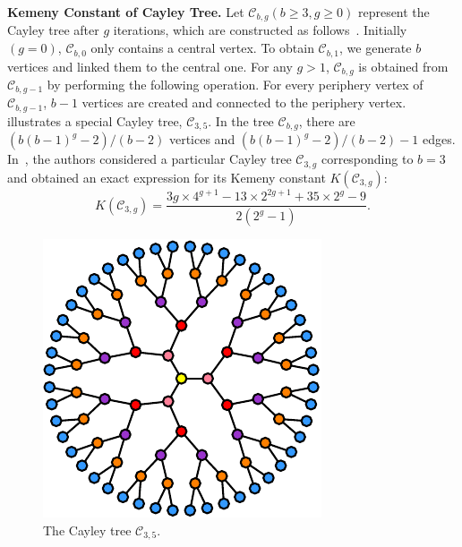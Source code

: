 \documentclass[10pt,twocolumn,twoside]{IEEEtran}
\begin{document}
\textbf{Kemeny Constant of Cayley Tree.}
Let \(\mathcal{C}_{b,g}(b\ge3,g\ge0)\) represent the Cayley tree after
\(g\) iterations, which are constructed  as follows~\cite{CaCh97,ChCa99}. Initially \((g = 0)\), \(\mathcal{C}_{b,0}\) only contains a central vertex. To obtain \(\mathcal{C}_{b,1}\), we generate  \(b\) vertices and linked them to
the central one. For any \(g>1\), \(\mathcal{C}_{b,g}\) is obtained from \(\mathcal{C}_{b,g-1}\) by performing the following operation. For every periphery vertex of \(\mathcal{C}_{b,g-1}\), \(b-1\) vertices are created and connected to
the periphery vertex.  illustrates a special Cayley tree,
\(\mathcal{C}_{3,5}\). In the tree \(\mathcal{C}_{b,g}\), there are \((b(b-1)^g-2)/(b-2)\) vertices and \((b(b-1)^g-2)/(b-2)-1\) edges. In~\cite{JuWuZh13}, the authors  considered a particular Cayley tree \(\mathcal{C}_{3,g}\) corresponding to \(b=3\) and obtained an exact expression for its  Kemeny constant \(K(\mathcal{C}_{3,g})\):
\begin{equation}\label{Kg03}
    K(\mathcal{C}_{3,g})=\frac{3g\times 4^{g+1}-13\times 2^{2g+1} + 35\times 2^g - 9}{2(2^g-1)}.
\end{equation}

\begin{figure}[!t]
    \centering
    \includegraphics[width=0.6\linewidth,trim=0 0 0 0]{Cayley.pdf}
    \caption{The Cayley tree \(\mathcal{C}_{3,5}\).}
    \label{Cayley}
\end{figure}
\end{document}
